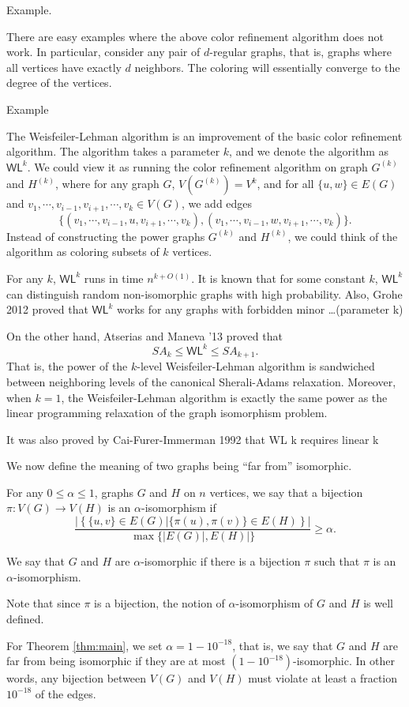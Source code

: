 \documentclass[a4paper,twoside,justified]{tufte-handout}
\begin{document}
Example.

There are easy examples where the above color refinement algorithm does not work. In particular, 
consider any pair of $d$-regular graphs, that is, graphs where all vertices have exactly $d$ neighbors.
The coloring will essentially converge to the degree of the vertices.

Example

The Weisfeiler-Lehman algorithm is an improvement of the basic color refinement algorithm.
The algorithm takes a parameter $k$, and we denote the algorithm as $\textsf{WL}^k$.
We could view it as running the color refinement algorithm on graph $G^{(k)}$ and $H^{(k)}$, where
for any graph $G$, $V(G^{(k)})=V^k$, and for all $\{u,w\} \in E(G)$ and $v_1,\cdots,v_{i-1},v_{i+1},\cdots,v_k \in V(G)$, 
we add edges
\[
\{(v_1,\cdots,v_{i-1},u,v_{i+1},\cdots,v_k),(v_1,\cdots,v_{i-1},w,v_{i+1},\cdots,v_k)\}.
\]
Instead of constructing the power graphs $G^{(k)}$ and $H^{(k)}$, we could think of the algorithm as
coloring subsets of $k$ vertices. 

For any $k$, $\textsf{WL}^k$ runs in time $n^{k+O(1)}$.
It is known that for some constant $k$, $\textsf{WL}^k$ can distinguish random non-isomorphic graphs
with high probability. Also, Grohe 2012 \cite{} proved that $\textsf{WL}^k$ works for 
any graphs with forbidden minor \ldots (parameter k)

On the other hand, Atserias and Maneva '13 proved that
\[
SA_k \le \textsf{WL}^k \le SA_{k+1}.
\]
That is, the power of the $k$-level Weisfeiler-Lehman algorithm is sandwiched between
neighboring levels of the canonical Sherali-Adams relaxation. Moreover, when $k=1$, 
the Weisfeiler-Lehman algorithm is exactly the same power as the linear programming relaxation of
the graph isomorphism problem.

It was also proved by Cai-Furer-Immerman 1992 that WL k requires linear k %

We now define the meaning of two graphs being ``far from'' isomorphic.
\begin{definition}\label{def:alpha-iso}
  For any $0 \le \alpha \le 1$, graphs $G$ and $H$ on $n$ vertices, we say that a bijection
  $\pi:V(G) \to V(H)$ is an $\alpha$-isomorphism if
  \[
  \frac{|\left\{ \{u,v\} \in E(G) | \{\pi(u),\pi(v)\} \in E(H) \right\}|}{\max \{|E(G)|,E(H)|\}} \ge \alpha.
  \]

  We say that $G$ and $H$ are $\alpha$-isomorphic if there is a bijection $\pi$ such that
  $\pi$ is an $\alpha$-isomorphism.
\end{definition}
\begin{remark}
  Note that since $\pi$ is a bijection, the notion of $\alpha$-isomorphism of $G$ and $H$ 
  is well defined.
\end{remark}
For Theorem \ref{thm:main}, we set $\alpha=1-10^{-18}$, that is, we say that $G$ and $H$ are far from being
isomorphic if they are at most $(1-10^{-18})$-isomorphic. In other words, any bijection between $V(G)$ and $V(H)$
must violate at least a fraction $10^{-18}$ of the edges.
\end{document}
